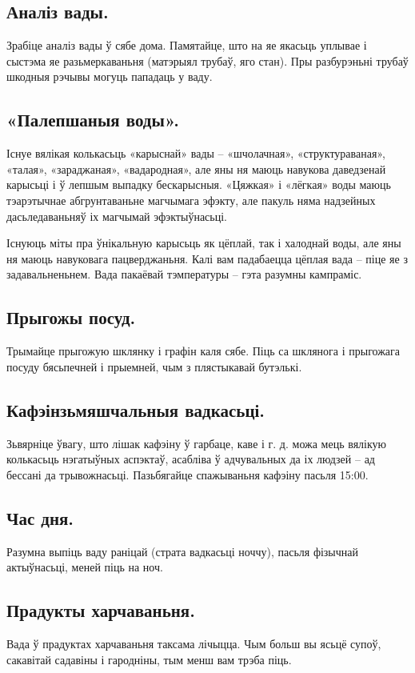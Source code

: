 \subsection{Аналіз вады.}
Зрабіце аналіз вады ў сябе дома. Памятайце, што на яе якасьць уплывае і сыстэма яе разьмеркаваньня (матэрыял трубаў, яго стан). Пры разбурэньні трубаў шкодныя рэчывы могуць пападаць у ваду.

\subsection{«Палепшаныя воды».}
Існуе вялікая колькасьць «карыснай» вады – «шчолачная», «структураваная», «талая», «зараджаная», «вадародная», але яны ня маюць навукова даведзенай карысьці і ў лепшым выпадку бескарысныя. «Цяжкая» і «лёгкая» воды маюць тэарэтычнае абгрунтаваньне магчымага эфэкту, але пакуль няма надзейных дасьледаваньняў іх магчымай эфэктыўнасьці.

Існуюць міты пра ўнікальную карысьць як цёплай, так і халоднай воды, але яны ня маюць навуковага пацверджаньня. Калі вам падабаецца цёплая вада – піце яе з задавальненьнем. Вада пакаёвай тэмпературы – гэта разумны кампраміс.

\subsection{Прыгожы посуд.}
Трымайце прыгожую шклянку і графін каля сябе. Піць са шклянога і прыгожага посуду бясьпечней і прыемней, чым з плястыкавай бутэлькі.

\subsection{Кафэінзьмяшчальныя вадкасьці.}
Зьвярніце ўвагу, што лішак кафэіну ў гарбаце, каве і г. д. можа мець вялікую колькасьць нэгатыўных аспэктаў, асабліва ў адчувальных да іх людзей – ад бессані да трывожнасьці. Пазьбягайце спажываньня кафэіну пасьля 15:00.

\subsection{Час дня.}
Разумна выпіць ваду раніцай (страта вадкасьці ноччу), пасьля фізычнай актыўнасьці, меней піць на ноч.

\subsection{Прадукты харчаваньня.}
Вада ў прадуктах харчаваньня таксама лічыцца. Чым больш вы ясьцё супоў, сакавітай садавіны і гародніны, тым менш вам трэба піць.

